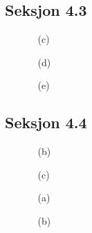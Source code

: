 \documentclass[a4paper, 12pt]{article}  %
\begin{document}
\subsection*{Seksjon 4.3}
\begin{enumerate}
    \item [\boxed{6}]
    \item [\boxed{12}]
    \item [\boxed{33}]
          \begin{enumerate}
              \item [(c)]
              \item [(d)]
          \end{enumerate}
    \item [\boxed{39}]
          \begin{enumerate}
              \item [(e)]
          \end{enumerate}
    \item [\boxed{49}]
\end{enumerate}

\subsection*{Seksjon 4.4}
\begin{enumerate}
    \item [\boxed{5}]
          \begin{enumerate}
              \item [(b)]
              \item [(c)]
          \end{enumerate}
    \item [\boxed{8}]
    \item [\boxed{11}]
          \begin{enumerate}
              \item [(a)]
              \item [(b)]
          \end{enumerate}
\end{enumerate}

\end{document}

